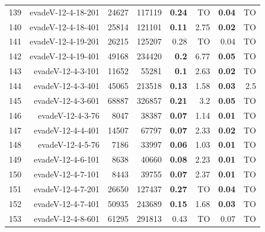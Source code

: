 \begin{longtable}{lrr@{\hskip 12pt}r@{\hskip 12pt}r@{\hskip 12pt}r@{\hskip 12pt}r@{\hskip 12pt}r}
139 & \multirow{1}{*}{evadeV-12-4-18-201} & \multirow{1}{*}{24627} & \multirow{1}{*}{117119} & \textbf{0.24} & TO & \textbf{0.04} & TO \\
140 & \multirow{1}{*}{evadeV-12-4-18-401} & \multirow{1}{*}{25814} & \multirow{1}{*}{121101} & \textbf{0.11} & 2.75 & \textbf{0.02} & TO \\
141 & \multirow{1}{*}{evadeV-12-4-19-201} & \multirow{1}{*}{26215} & \multirow{1}{*}{125207} & 0.28 & TO & 0.04 & TO \\
142 & \multirow{1}{*}{evadeV-12-4-19-401} & \multirow{1}{*}{49168} & \multirow{1}{*}{234420} & \textbf{0.2} & 6.77 & \textbf{0.05} & TO \\
143 & \multirow{1}{*}{evadeV-12-4-3-101} & \multirow{1}{*}{11652} & \multirow{1}{*}{55281} & \textbf{0.1} & 2.63 & \textbf{0.02} & TO \\
144 & \multirow{1}{*}{evadeV-12-4-3-401} & \multirow{1}{*}{45065} & \multirow{1}{*}{213518} & \textbf{0.13} & 1.58 & \textbf{0.03} & 2.5 \\
145 & \multirow{1}{*}{evadeV-12-4-3-601} & \multirow{1}{*}{68887} & \multirow{1}{*}{326857} & \textbf{0.21} & 3.2 & \textbf{0.05} & TO \\
146 & \multirow{1}{*}{evadeV-12-4-3-76} & \multirow{1}{*}{8047} & \multirow{1}{*}{38387} & \textbf{0.07} & 1.14 & \textbf{0.01} & TO \\
147 & \multirow{1}{*}{evadeV-12-4-4-401} & \multirow{1}{*}{14507} & \multirow{1}{*}{67797} & \textbf{0.07} & 2.33 & \textbf{0.02} & TO \\
148 & \multirow{1}{*}{evadeV-12-4-5-76} & \multirow{1}{*}{7186} & \multirow{1}{*}{33997} & \textbf{0.06} & 1.03 & \textbf{0.01} & TO \\
149 & \multirow{1}{*}{evadeV-12-4-6-101} & \multirow{1}{*}{8638} & \multirow{1}{*}{40660} & \textbf{0.08} & 2.23 & \textbf{0.01} & TO \\
150 & \multirow{1}{*}{evadeV-12-4-7-101} & \multirow{1}{*}{8443} & \multirow{1}{*}{39755} & \textbf{0.07} & 2.37 & \textbf{0.01} & TO \\
151 & \multirow{1}{*}{evadeV-12-4-7-201} & \multirow{1}{*}{26650} & \multirow{1}{*}{127437} & \textbf{0.27} & TO & \textbf{0.04} & TO \\
152 & \multirow{1}{*}{evadeV-12-4-7-401} & \multirow{1}{*}{50935} & \multirow{1}{*}{243689} & \textbf{0.15} & 1.68 & \textbf{0.03} & TO \\
153 & \multirow{1}{*}{evadeV-12-4-8-601} & \multirow{1}{*}{61295} & \multirow{1}{*}{291813} & 0.43 & TO & 0.07 & TO \\

\end{longtable}
